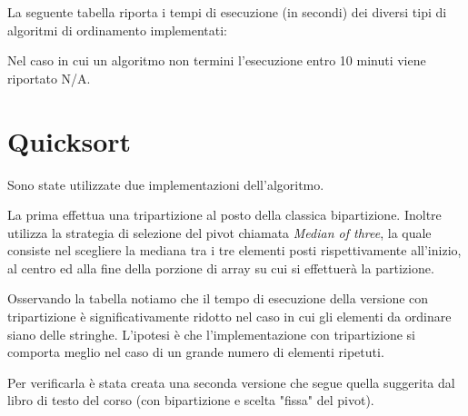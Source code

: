 \documentclass{report}
\begin{document}
La seguente tabella riporta i tempi di esecuzione (in secondi) dei diversi tipi di algoritmi di ordinamento implementati:

\begin{table} [!htb]
\centering
{}
\end{table}

Nel caso in cui un algoritmo non termini l'esecuzione entro 10 minuti viene riportato N/A.

\section{Quicksort}

Sono state utilizzate due implementazioni dell'algoritmo.

La prima effettua una tripartizione al posto della classica bipartizione. Inoltre utilizza la strategia di selezione del pivot chiamata \textit{Median of three}, la quale consiste nel scegliere la mediana tra i tre elementi posti rispettivamente all'inizio, al centro ed alla fine della porzione di array su cui si effettuerà la partizione.

Osservando la tabella notiamo che il tempo di esecuzione della versione con tripartizione è significativamente ridotto nel caso in cui gli elementi da ordinare siano delle stringhe. L'ipotesi è che l'implementazione con tripartizione si comporta meglio nel caso di un grande numero di elementi ripetuti.

Per verificarla è stata creata una seconda versione che segue quella suggerita dal libro di testo del corso (con bipartizione e scelta "fissa" del pivot).
\end{document}
